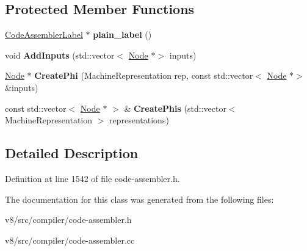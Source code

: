 \subsection*{Protected Member Functions}
\begin{DoxyCompactItemize}
\item 
\mbox{\label{classv8_1_1internal_1_1compiler_1_1CodeAssemblerParameterizedLabelBase_a0f3eeb53fec5a3a7df7bfc1b8815d91a}} 
\mbox{\hyperlink{classv8_1_1internal_1_1compiler_1_1CodeAssemblerLabel}{Code\+Assembler\+Label}} $\ast$ {\bfseries plain\+\_\+label} ()
\item 
\mbox{\label{classv8_1_1internal_1_1compiler_1_1CodeAssemblerParameterizedLabelBase_a6206758e5984f7c3e0afb9912772c92b}} 
void {\bfseries Add\+Inputs} (std\+::vector$<$ \mbox{\hyperlink{classv8_1_1internal_1_1compiler_1_1Node}{Node}} $\ast$$>$ inputs)
\item 
\mbox{\label{classv8_1_1internal_1_1compiler_1_1CodeAssemblerParameterizedLabelBase_a4d332c90323b6ef67cab8d935a71c806}} 
\mbox{\hyperlink{classv8_1_1internal_1_1compiler_1_1Node}{Node}} $\ast$ {\bfseries Create\+Phi} (Machine\+Representation rep, const std\+::vector$<$ \mbox{\hyperlink{classv8_1_1internal_1_1compiler_1_1Node}{Node}} $\ast$$>$ \&inputs)
\item 
\mbox{\label{classv8_1_1internal_1_1compiler_1_1CodeAssemblerParameterizedLabelBase_ad7a3ca7bff88ef7d0cea057e7cc39aae}} 
const std\+::vector$<$ \mbox{\hyperlink{classv8_1_1internal_1_1compiler_1_1Node}{Node}} $\ast$ $>$ \& {\bfseries Create\+Phis} (std\+::vector$<$ Machine\+Representation $>$ representations)
\end{DoxyCompactItemize}


\subsection{Detailed Description}


Definition at line 1542 of file code-\/assembler.\+h.



The documentation for this class was generated from the following files\+:\begin{DoxyCompactItemize}
\item 
v8/src/compiler/code-\/assembler.\+h\item 
v8/src/compiler/code-\/assembler.\+cc\end{DoxyCompactItemize}
